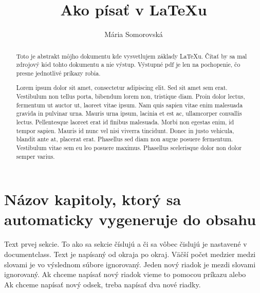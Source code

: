 \documentclass[11pt, a4paper]{article}
\author{Mária Somorovská}
\title{Ako písať v \LaTeX u}
\begin{document}
\maketitle

\newpage


\begin{abstract}
Toto je abstrakt môjho dokumentu kde vysvetlujem základy \LaTeX u. Čítať by sa mal zdrojový kód tohto dokumentu a nie výstup. Výstupné pdf je len na pochopenie, čo presne jednotlivé príkazy robia. 

Lorem ipsum dolor sit amet, consectetur adipiscing elit. Sed sit amet sem erat. Vestibulum non tellus porta, bibendum lorem non, tristique diam. Proin dolor lectus, fermentum ut auctor ut, laoreet vitae ipsum. Nam quis sapien vitae enim malesuada gravida in pulvinar urna. Mauris urna ipsum, lacinia et est ac, ullamcorper convallis lectus. Pellentesque laoreet erat id finibus malesuada. Morbi non egestas enim, id tempor sapien. Mauris id nunc vel nisi viverra tincidunt. Donec in justo vehicula, blandit ante at, placerat erat. Phasellus sed diam non augue posuere fermentum. Vestibulum vitae sem eu leo posuere maximus. Phasellus scelerisque dolor non dolor semper varius. 
\end{abstract}

\newpage

\tableofcontents

\newpage

\section{Názov kapitoly, ktorý sa automaticky vygeneruje do obsahu}
Text prvej sekcie. To ako sa sekcie číslujú a či sa vôbec čislujú je nastavené v documentclass. Text je napísaný od okraja po okraj. Väčší    počet    medzier    medzi    slovami    je    vo    výslednom    súbore    ignorovaný.
Jeden
nový
riadok
je
mezdi
slovami
ignorovaný.
Ak chceme napísať nový riadok vieme to pomocou príkazu \newline alebo \\ Ak chceme napísať nový odsek, treba napísať dva nové riadky. 
\end{document}
